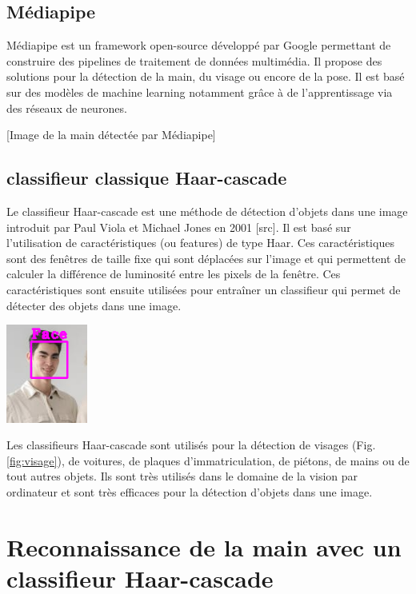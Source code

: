 \documentclass[11pt]{article}
\begin{document}
\subsection{Médiapipe}
Médiapipe est un framework open-source développé par Google permettant de construire des pipelines de traitement de données multimédia. Il propose des solutions pour la détection de la main, du visage ou encore de la pose. Il est basé sur des modèles de machine learning notamment grâce à de l'apprentissage via des réseaux de neurones. \bigbreak

[Image de la main détectée par Médiapipe]


\subsection{classifieur classique Haar-cascade}
Le classifieur Haar-cascade est une méthode de détection d'objets dans une image introduit par Paul Viola et Michael Jones en 2001 [src]. Il est basé sur l'utilisation de caractéristiques (ou features) de type Haar. Ces caractéristiques sont des fenêtres de taille fixe qui sont déplacées sur l'image et qui permettent de calculer la différence de luminosité entre les pixels de la fenêtre. Ces caractéristiques sont ensuite utilisées pour entraîner un classifieur qui permet de détecter des objets dans une image. \bigbreak

\begin{center}
    \includegraphics[width=0.2\textwidth]{images/visage.png}
    \label{fig:visage}
\end{center}

Les classifieurs Haar-cascade sont utilisés pour la détection de visages (Fig. \ref{fig:visage}), de voitures, de plaques d'immatriculation, de piétons, de mains ou de tout autres objets. Ils sont très utilisés dans le domaine de la vision par ordinateur et sont très efficaces pour la détection d'objets dans une image. \bigbreak



\newpage

\section{Reconnaissance de la main avec un classifieur Haar-cascade}
\end{document}
